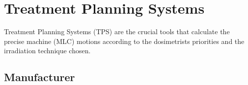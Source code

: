 \section{Treatment Planning Systems}
Treatment Planning Systems (TPS) are the crucial tools that calculate the precise machine (MLC) motions according to the dosimetrists priorities and the irradiation technique chosen.

\subsection{Manufacturer}
%	
%	
\Needspace{5cm}
